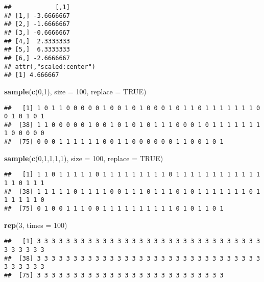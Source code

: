 \documentclass[
]{article}
\newenvironment{Shaded}{\begin{snugshade}}{\end{snugshade}}
\newcommand{\AttributeTok}[1]{\textcolor[rgb]{0.13,0.29,0.53}{#1}}
\newcommand{\ConstantTok}[1]{\textcolor[rgb]{0.56,0.35,0.01}{#1}}
\newcommand{\DecValTok}[1]{\textcolor[rgb]{0.00,0.00,0.81}{#1}}
\newcommand{\FunctionTok}[1]{\textcolor[rgb]{0.13,0.29,0.53}{\textbf{#1}}}
\newcommand{\NormalTok}[1]{#1}
\begin{document}
\begin{verbatim}
##            [,1]
## [1,] -3.6666667
## [2,] -1.6666667
## [3,] -0.6666667
## [4,]  2.3333333
## [5,]  6.3333333
## [6,] -2.6666667
## attr(,"scaled:center")
## [1] 4.666667
\end{verbatim}

\begin{Shaded}
\begin{Highlighting}[]
\FunctionTok{sample}\NormalTok{(}\FunctionTok{c}\NormalTok{(}\DecValTok{0}\NormalTok{,}\DecValTok{1}\NormalTok{), }\AttributeTok{size =} \DecValTok{100}\NormalTok{, }\AttributeTok{replace =} \ConstantTok{TRUE}\NormalTok{)}
\end{Highlighting}
\end{Shaded}

\begin{verbatim}
##   [1] 1 0 1 1 0 0 0 0 0 1 0 0 1 0 1 0 0 0 1 0 1 1 0 1 1 1 1 1 1 1 0 0 1 0 1 0 1
##  [38] 1 1 0 0 0 0 0 1 0 0 1 0 1 0 1 0 1 1 1 0 0 0 1 0 1 1 1 1 1 1 1 1 0 0 0 0 0
##  [75] 0 0 0 1 1 1 1 1 1 0 0 1 1 0 0 0 0 0 0 1 1 0 0 1 0 1
\end{verbatim}

\begin{Shaded}
\begin{Highlighting}[]
\FunctionTok{sample}\NormalTok{(}\FunctionTok{c}\NormalTok{(}\DecValTok{0}\NormalTok{,}\DecValTok{1}\NormalTok{,}\DecValTok{1}\NormalTok{,}\DecValTok{1}\NormalTok{,}\DecValTok{1}\NormalTok{), }\AttributeTok{size =} \DecValTok{100}\NormalTok{, }\AttributeTok{replace =} \ConstantTok{TRUE}\NormalTok{)}
\end{Highlighting}
\end{Shaded}

\begin{verbatim}
##   [1] 1 1 0 1 1 1 1 1 0 1 1 1 1 1 1 1 1 1 0 1 1 1 1 1 1 1 1 1 1 1 1 1 1 0 1 1 1
##  [38] 1 1 1 1 1 0 1 1 1 1 0 0 1 1 1 0 1 1 1 0 1 0 1 1 1 1 1 1 1 0 1 1 1 1 1 1 0
##  [75] 0 1 0 0 1 1 1 0 0 1 1 1 1 1 1 1 1 1 1 0 1 0 1 1 0 1
\end{verbatim}

\begin{Shaded}
\begin{Highlighting}[]
\FunctionTok{rep}\NormalTok{(}\DecValTok{3}\NormalTok{, }\AttributeTok{times =} \DecValTok{100}\NormalTok{)}
\end{Highlighting}
\end{Shaded}

\begin{verbatim}
##   [1] 3 3 3 3 3 3 3 3 3 3 3 3 3 3 3 3 3 3 3 3 3 3 3 3 3 3 3 3 3 3 3 3 3 3 3 3 3
##  [38] 3 3 3 3 3 3 3 3 3 3 3 3 3 3 3 3 3 3 3 3 3 3 3 3 3 3 3 3 3 3 3 3 3 3 3 3 3
##  [75] 3 3 3 3 3 3 3 3 3 3 3 3 3 3 3 3 3 3 3 3 3 3 3 3 3 3
\end{verbatim}
\end{document}
